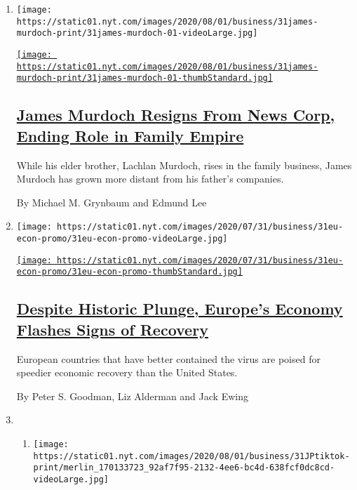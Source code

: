 \begin{enumerate}
\def\labelenumi{\arabic{enumi}.}
\item
  \texttt{[image: https://static01.nyt.com/images/2020/08/01/business/31james-murdoch-print/31james-murdoch-01-videoLarge.jpg]}

  \href{/2020/07/31/business/media/james-murdoch-resigns-news-corp.html}{\texttt{[image: https://static01.nyt.com/images/2020/08/01/business/31james-murdoch-print/31james-murdoch-01-thumbStandard.jpg]}}

  \hypertarget{james-murdoch-resigns-from-news-corp-ending-role-in-family-empire}{%
  \subsection{\texorpdfstring{\href{/2020/07/31/business/media/james-murdoch-resigns-news-corp.html}{James
  Murdoch Resigns From News Corp, Ending Role in Family
  Empire}}{James Murdoch Resigns From News Corp, Ending Role in Family Empire}}\label{james-murdoch-resigns-from-news-corp-ending-role-in-family-empire}}

  While his elder brother, Lachlan Murdoch, rises in the family
  business, James Murdoch has grown more distant from his father's
  companies.

  By Michael M. Grynbaum and Edmund Lee
\item
  \texttt{[image: https://static01.nyt.com/images/2020/07/31/business/31eu-econ-promo/31eu-econ-promo-videoLarge.jpg]}

  \href{/2020/07/31/business/europe-economy-recovery-coronavirus.html}{\texttt{[image: https://static01.nyt.com/images/2020/07/31/business/31eu-econ-promo/31eu-econ-promo-thumbStandard.jpg]}}

  \hypertarget{despite-historic-plunge-europes-economy-flashes-signs-of-recovery}{%
  \subsection{\texorpdfstring{\href{/2020/07/31/business/europe-economy-recovery-coronavirus.html}{Despite
  Historic Plunge, Europe's Economy Flashes Signs of
  Recovery}}{Despite Historic Plunge, Europe's Economy Flashes Signs of Recovery}}\label{despite-historic-plunge-europes-economy-flashes-signs-of-recovery}}

  European countries that have better contained the virus are poised for
  speedier economic recovery than the United States.

  By Peter S. Goodman, Liz Alderman and Jack Ewing
\item
  \begin{enumerate}
  \def\labelenumii{\arabic{enumii}.}
  \item
    \texttt{[image: https://static01.nyt.com/images/2020/08/01/business/31JPtiktok-print/merlin\_170133723\_92af7f95-2132-4ee6-bc4d-638fcf0dc8cd-videoLarge.jpg]}


\end{enumerate}
\end{enumerate}
